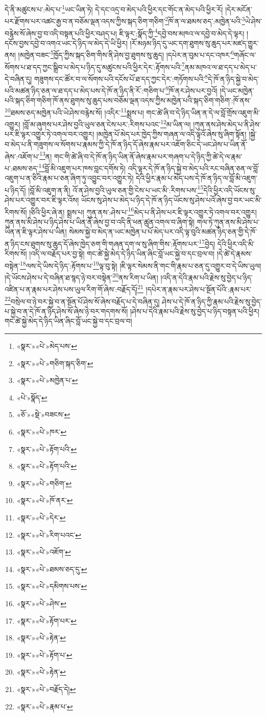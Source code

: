 དེ་ནི་མཚུངས་པ་:མེད་པ་\footnote{«སྣར་»«པེ་»མེད་པས་}ཡང་ཡིན་ཏེ། དེ་དང་འདྲ་བ་མེད་པའི་ཕྱིར་དང་གོང་ན་མེད་པའི་ཕྱིར་རོ། །དེར་མངོན་པར་རྫོགས་པར་འཚང་རྒྱ་བ་ན་བཅོམ་ལྡན་འདས་ཀྱིས་སྐད་ཅིག་གཅིག་\footnote{«སྣར་»«པེ་»གཅིག་སྐད་ཅིག་}ཁོ་ན་ལ་ཐམས་ཅད་:མཁྱེན་པའི་\footnote{«སྣར་»«པེ་»མཁྱེན་པ་}ཡེ་ཤེས་བརྙེས་སོ་ཞེས་བྱ་བ་འདི་བསྟན་པའི་ཕྱིར་བཤད་པ། ཇི་ལྟར་:སྣོད་ཀྱི་\footnote{«པེ་»སྣོད་}དབྱེ་བས་མཁའ་ལ་དབྱེ་བ་མེད་དེ་ལྟར། །དངོས་བྱས་དབྱེ་བ་འགའ་ཡང་དེ་ཉིད་ལ་མེད་དེ་ཡི་ཕྱིར། །རོ་མཉམ་ཉིད་དུ་ཡང་དག་ཐུགས་སུ་ཆུད་པར་མཛད་གྱུར་ནས། །མཁྱེན་བཟང་\footnote{«ཅོ་»«སྡེ་»བཟངས་}ཁྱོད་ཀྱིས་སྐད་ཅིག་གིས་ནི་ཤེས་བྱ་ཐུགས་སུ་ཆུད། །དཔེར་ན་བུམ་པ་དང་འཁར་\footnote{«སྣར་»«པེ་»ཁར་}གཞོང་ལ་སོགས་པ་ཐ་དད་ཀྱང་སྒྲིབ་པ་མེད་པ་ཉིད་དུ་མཚུངས་པའི་ཕྱིར་དེར་:རྟོགས་པའི་\footnote{«སྣར་»«པེ་»རྟོག་པའི་}ནམ་མཁའ་ལ་ཐ་དད་པ་མེད་པ་དེ་བཞིན་དུ། གཟུགས་དང་ཚོར་བ་ལ་སོགས་པའི་དངོས་པོ་ཐ་དད་ཀྱང་དེར་:གཏོགས་པའི་\footnote{«སྣར་»«པེ་»རྟོག་པའི་}དེ་ཁོ་ན་ཉིད་སྐྱེ་བ་མེད་པའི་མཚན་ཉིད་ཅན་ལ་ཐ་དད་པ་མེད་པས་དེ་ཁོ་ན་ཉིད་ནི་རོ་:གཅིག་པ་\footnote{«སྣར་»«པེ་»གཅིག་}ཁོ་ནར་ཤེས་པར་བྱའོ། །དེ་ཡང་མཁྱེན་པའི་སྐད་ཅིག་གཅིག་ཁོ་ནས་ཐུགས་སུ་ཆུད་པས་བཅོམ་ལྡན་འདས་ཀྱིས་མཁྱེན་པའི་སྐད་ཅིག་གཅིག་:ཁོ་ནས་\footnote{«སྣར་»«པེ་»ཁོ་ནར་}ཐམས་ཅད་མཁྱེན་པའི་ཡེ་ཤེས་བརྙེས་སོ། །འདིར་\footnote{«སྣར་»«པེ་»དེར་}སྨྲས་པ། གང་ཚེ་ཞི་བ་དེ་ཉིད་ཡིན་ན་དེ་ལ་བློ་གྲོས་འཇུག་མི་འགྱུར། །བློ་མ་ཞུགས་པར་ཤེས་བྱའི་ཡུལ་ཅན་ངེས་པར་:རིགས་པའང་\footnote{«སྣར་»«པེ་»རིག་པའང་}མ་ཡིན་ལ། །ཀུན་ནས་ཤེས་མེད་པ་ནི་ཤེས་པར་ཇི་ལྟར་འགྱུར་ཏེ་འགལ་བར་འགྱུར། །མཁྱེན་པོ་མེད་པར་ཁྱེད་ཀྱིས་གཞན་ལ་འདི་ལྟའོ་ཞེས་སུ་ཞིག་སྟོན། །སྐྱེ་བ་མེད་པ་ནི་གཟུགས་ལ་སོགས་པ་རྣམས་ཀྱི་དེ་ཁོ་ན་ཉིད་དོ་ཞེས་རྣམ་པར་འཇོག་ཅིང་དེ་ཡང་ཤེས་པ་ཡིན་ནོ་ཞེས་:འཇོག་པ་\footnote{«སྣར་»«པེ་»འཇོག་}ན། གང་གི་ཚེ་ཞི་བ་དེ་ཁོ་ན་ཉིད་ཡིན་ནོ་ཞེས་རྣམ་པར་གཞག་པ་དེ་ཉིད་ཀྱི་ཚེ་དེ་ལ་རྣམ་པ་:ཐམས་ཅད་\footnote{«སྣར་»«པེ་»ཐམས་ཅད་དུ་}བློ་མི་འཇུག་པར་ཁས་བླང་དགོས་ཏེ། འདི་ལྟར་དེ་ཁོ་ན་ཉིད་སྐྱེ་བ་མེད་པའི་རང་བཞིན་ཅན་ལ་བློ་འཇུག་པ་ན་ཅིའི་རྣམ་པ་ཅན་ཞིག་ཏུ་འབྱུང་བར་འགྱུར་ཏེ། དེའི་ཕྱིར་རྣམ་པ་མེད་པས་དེ་ཁོ་ན་ཉིད་ལ་བློ་མི་འཇུག་པ་ཉིད་དོ། །བློ་མི་འཇུག་ན་ནི། འོ་ན་ཤེས་བྱའི་ཡུལ་ཅན་གྱི་ངེས་པ་ཡང་མི་:རིགས་པས་\footnote{«སྣར་»«པེ་»དམིགས་པས་}དེའི་ཕྱིར་འདི་ཡོངས་སུ་ཤེས་པར་འགྱུར་བར་ཇི་ལྟར་འོས། ཡོངས་སུ་ཤེས་པ་མེད་པ་ཉིད་དེ་ཁོ་ན་ཉིད་ཡོངས་སུ་ཤེས་པའོ་ཞེས་བྱ་བར་ཡང་མི་རིགས་སོ། །ཅིའི་ཕྱིར་ཞེ་ན། སྨྲས་པ། ཀུན་ནས་:ཤེས་པ་\footnote{«སྣར་»«པེ་»ཤེས་}མེད་པ་ནི་ཤེས་པར་ཇི་ལྟར་འགྱུར་ཏེ་འགལ་བར་འགྱུར། ཀུན་ནས་མི་ཤེས་པ་ཉིད་ཤེས་པ་ཡིན་ནོ་ཞེས་བྱ་བ་འདི་ནི་ཕན་ཚུན་འགལ་བ་ཞིག་སྟེ། གལ་ཏེ་ཀུན་ནས་མི་ཤེས་པ་ཡིན་ན་ཇི་ལྟར་ཤེས་པ་ཡིན། སེམས་སྐྱེ་བ་མེད་ན་ཡང་མཁྱེན་པ་པོ་མེད་པར་འདི་ལྟ་བུའི་མཚན་ཉིད་ཅན་གྱི་དེ་ཁོ་ན་ཉིད་ངས་ཐུགས་སུ་ཆུད་དོ་ཞེས་ཁྱེད་ཅག་གི་གཞན་དག་ལ་སུ་ཞིག་གིས་:རྟོགས་པར་\footnote{«སྣར་»«པེ་»རྟོག་པར་}བྱེད། དེའི་ཕྱིར་འདི་མི་རིགས་སོ། །འདི་ལ་བརྗོད་པར་བྱ་སྟེ། གང་ཚེ་སྐྱེ་མེད་དེ་ཉིད་ཡིན་ཞིང་བློ་ཡང་སྐྱེ་བ་དང་བྲལ་བ། །དེ་ཚེ་དེ་རྣམས་བསྟེན་\footnote{«སྣར་»«པེ་»རྟེན་}ལས་དེ་ཡིས་དེ་ཉིད་:རྟོགས་པ་\footnote{«སྣར་»«པེ་»རྟོག་པ་}ལྟ་བུ་སྟེ། །ཇི་ལྟར་སེམས་ནི་གང་གི་རྣམ་པ་ཅན་དུ་འགྱུར་བ་དེ་ཡིས་ཡུལ། །དེ་ཡོངས་ཤེས་པ་དེ་བཞིན་ཐ་སྙད་ཉེ་བར་བསྟེན་\footnote{«སྣར་»«པེ་»རྟེན་}ནས་རིག་པ་ཡིན། །འདི་ན་དེའི་རྣམ་པའི་རྗེས་སུ་བྱེད་པ་ཉིད་འཛིན་པ་ན་རྣམ་པར་ཤེས་པས་ཡུལ་རིག་གོ་ཞེས་:བརྗོད་དོ།\footnote{«སྣར་»«པེ་»བརྗོད་དེ།} །དཔེར་ན་རྣམ་པར་ཤེས་པ་སྔོན་པོའི་:རྣམ་པར་\footnote{«སྣར་»«པེ་»རྣམ་པ་}བསྲེལ་བ་ཉེ་བར་སྐྱེ་བ་ན་སྔོན་པོ་ཤེས་སོ་ཞེས་བརྗོད་པ་དེ་བཞིན་དུ། ཤེས་པ་དེ་ཁོ་ན་ཉིད་ཀྱི་རྣམ་པའི་རྗེས་སུ་བྱེད་པ་སྐྱེ་བ་ན་དེ་ཁོ་ན་ཉིད་ཤེས་སོ་ཞེས་ཉེ་བར་གདགས་སོ། །ཤེས་པ་དེའི་རྣམ་པའི་རྗེས་སུ་བྱེད་པ་ཉིད་བསྟན་པའི་ཕྱིར། གང་ཚེ་སྐྱེ་མེད་དེ་ཉིད་ཡིན་ཞིང་བློ་ཡང་སྐྱེ་བ་དང་བྲལ་བ། 